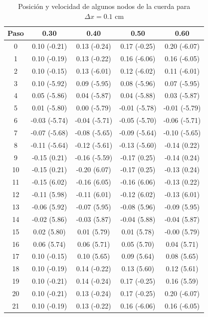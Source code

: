 \documentclass[11pt]{article}
\begin{document}
\begin{table}[t]
\center
\begin{small}
\begin{tabular}{ c c c c c }
\hline
Paso & 0.30 & 0.40 & 0.50 & 0.60 \\
\hline
\hline
0 & 0.10 (-0.21) & 0.13 (-0.24) & 0.17 (-0.25) & 0.20 (-6.07) \\
1 & 0.10 (-0.19) & 0.13 (-0.22) & 0.16 (-6.06) & 0.16 (-6.05) \\
2 & 0.10 (-0.15) & 0.13 (-6.01) & 0.12 (-6.02) & 0.11 (-6.01) \\
3 & 0.10 (-5.92) & 0.09 (-5.95) & 0.08 (-5.96) & 0.07 (-5.95) \\
4 & 0.05 (-5.86) & 0.04 (-5.87) & 0.04 (-5.88) & 0.03 (-5.87) \\
5 & 0.01 (-5.80) & 0.00 (-5.79) & -0.01 (-5.78) & -0.01 (-5.79) \\
6 & -0.03 (-5.74) & -0.04 (-5.71) & -0.05 (-5.70) & -0.06 (-5.71) \\
7 & -0.07 (-5.68) & -0.08 (-5.65) & -0.09 (-5.64) & -0.10 (-5.65) \\
8 & -0.11 (-5.64) & -0.12 (-5.61) & -0.13 (-5.60) & -0.14 (0.22) \\
9 & -0.15 (0.21) & -0.16 (-5.59) & -0.17 (0.25) & -0.14 (0.24) \\
10 & -0.15 (0.21) & -0.20 (6.07) & -0.17 (0.25) & -0.13 (0.24) \\
11 & -0.15 (6.02) & -0.16 (6.05) & -0.16 (6.06) & -0.13 (0.22) \\
12 & -0.11 (5.98) & -0.11 (6.01) & -0.12 (6.02) & -0.13 (6.01) \\
13 & -0.06 (5.92) & -0.07 (5.95) & -0.08 (5.96) & -0.09 (5.95) \\
14 & -0.02 (5.86) & -0.03 (5.87) & -0.04 (5.88) & -0.04 (5.87) \\
15 & 0.02 (5.80) & 0.01 (5.79) & 0.01 (5.78) & -0.00 (5.79) \\
16 & 0.06 (5.74) & 0.06 (5.71) & 0.05 (5.70) & 0.04 (5.71) \\
17 & 0.10 (-0.15) & 0.10 (5.65) & 0.09 (5.64) & 0.08 (5.65) \\
18 & 0.10 (-0.19) & 0.14 (-0.22) & 0.13 (5.60) & 0.12 (5.61) \\
19 & 0.10 (-0.21) & 0.14 (-0.24) & 0.17 (-0.25) & 0.16 (5.59) \\
\hline
20 & 0.10 (-0.21) & 0.13 (-0.24) & 0.17 (-0.25) & 0.20 (-6.07) \\
\hline
21 & 0.10 (-0.19) & 0.13 (-0.22) & 0.16 (-6.06) & 0.16 (-6.05) \\
\end{tabular}
\end{small}
\caption{Posición y velocidad de algunos nodos de la cuerda para $\Delta{x} = 0.1$ cm }
\label{tab:est_velocidad}
\end{table}
\end{document}
